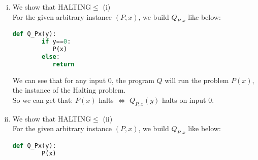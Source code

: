 \begin{enumerate}[(i)]
    \item We show that HALTING$\leq$ (i)\\
    For the given arbitrary instance $(P, x)$, we build $Q_{P,x}$ like below:
    \begin{lstlisting}[language=python]
    def Q_Px(y):
        if y==0:
           P(x)
        else:
           return
    \end{lstlisting}
    We can see that for any input 0, the program $Q$ will run the problem $P(x)$, the instance of the Halting problem.\\
    So we can get that: $P(x)$ halts $\Leftrightarrow$ $Q_{P,x}(y)$ halts on input 0.
    \item We show that HALTING$\leq$ (ii)\\
    For the given arbitrary instance $(P, x)$, we build $Q_{P,x}$ like below:
    \begin{lstlisting}[language=python]
    def Q_Px(y):
        P(x)
        

\end{lstlisting}
\end{enumerate}
